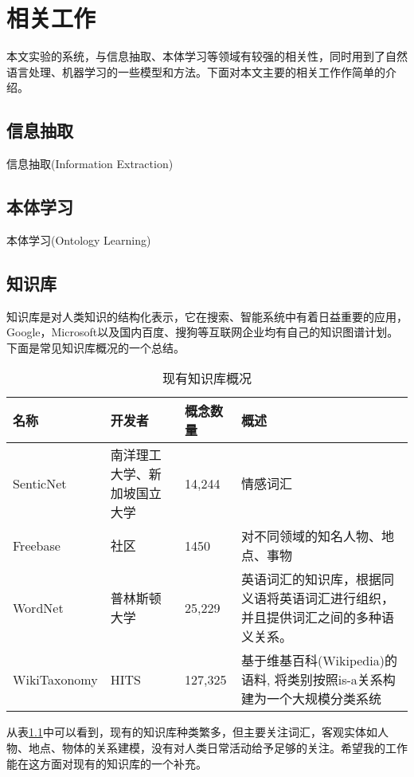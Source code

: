 \chapter{相关工作}
本文实验的系统，与信息抽取、本体学习等领域有较强的相关性，同时用到了自然语言处理、机器学习的一些模型和方法。下面对本文主要的相关工作作简单的介绍。
\section{信息抽取}
信息抽取(Information Extraction)
\section{本体学习}
本体学习(Ontology Learning)

\section{知识库}
知识库是对人类知识的结构化表示，它在搜索、智能系统中有着日益重要的应用，Google，Microsoft以及国内百度、搜狗等互联网企业均有自己的知识图谱计划。下面是常见知识库概况的一个总结。

\begin{table}[!h]
\begin{tabular}[0.7\textwidth]{|l|p{2cm}|l|p{4cm}|}
\hline
名称 & 开发者 & 概念数量  & 概述 \\
\hline
SenticNet & 南洋理工大学、新加坡国立大学 & 14,244	& 情感词汇  \\
\hline
Freebase & 社区	& 1450	& 对不同领域的知名人物、地点、事物 \\
\hline
WordNet\cite{miller1995wordnet} & 普林斯顿大学 & 25,229 & 英语词汇的知识库，根据同义语将英语词汇进行组织，并且提供词汇之间的多种语义关系。 \\
\hline
WikiTaxonomy\cite{ponzetto2007deriving}	& HITS & 127,325 & 基于维基百科(Wikipedia)的语料, 将类别按照is-a关系构建为一个大规模分类系统 \\
\hline
\end{tabular}
\caption{现有知识库概况}
\label{table:knowledge_base}
\end{table}

从表\ref{table:knowledge_base}中可以看到，现有的知识库种类繁多，但主要关注词汇，客观实体如人物、地点、物体的关系建模，没有对人类日常活动给予足够的关注。希望我的工作能在这方面对现有的知识库的一个补充。